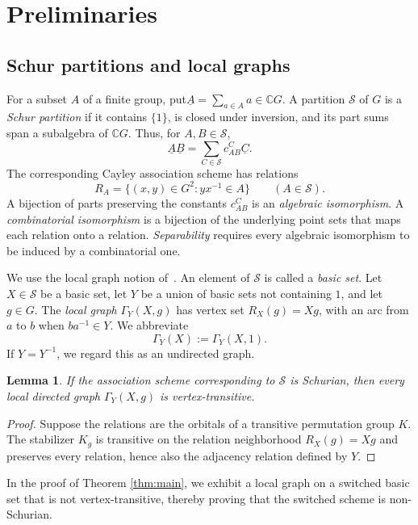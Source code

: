 \documentclass[11pt]{amsart}
\numberwithin{equation}{section}
\newtheorem{lemma}[theorem]{Lemma}
\theoremstyle{definition}
\theoremstyle{remark}
\newcommand{\C}{\mathbb C}
\newcommand{\clsum}[1]{\underline{#1}}
\begin{document}
\section{Preliminaries}

\subsection{Schur partitions and local graphs}

For a subset $A$ of a finite group, put$\clsum{A}=\sum_{a\in A}a\in\C G$.
A partition $\mathcal S$ of $G$ is a \emph{Schur partition} if it contains $\{1\}$, is closed under inversion, and its part sums span a subalgebra of $\C G$. 
Thus, for $A,B\in\mathcal S$,
\[
 \clsum{A}\clsum{B}=\sum_{C\in\mathcal S}c_{AB}^{C}\clsum{C}.
\]
The corresponding Cayley association scheme has relations
\[
 R_A=\{(x,y)\in G^2:yx^{-1}\in A\}\qquad(A\in\mathcal S).
\]
A bijection of parts preserving the constants $c_{AB}^C$ is an
\emph{algebraic isomorphism}. 
A \emph{combinatorial isomorphism} is a bijection of the underlying point sets that maps each relation onto a relation.
\emph{Separability} requires every algebraic isomorphism to be induced by a combinatorial one.

We use the local graph notion of~\cite[Definition~3.7]{HKK}. 
An element of $\mathcal S$ is called a \emph{basic set}. 
Let $X\in\mathcal S$ be a basic set, let $Y$ be a union of basic sets not containing $1$, and let $g\in G$. 
The \emph{local graph} $\Gamma_Y(X,g)$ has vertex set $R_X(g)=Xg$, with an arc from $a$ to $b$ when $ba^{-1}\in Y$. 
We abbreviate
\[
 \Gamma_Y(X):=\Gamma_Y(X,1).
\]
If $Y=Y^{-1}$, we regard this as an undirected graph.

\begin{lemma}\label{lem:local-schurian}
If the association scheme corresponding to $\mathcal S$ is Schurian, then every local directed graph $\Gamma_Y(X,g)$ is vertex-transitive.
\end{lemma}
\begin{proof}
Suppose the relations are the orbitals of a transitive permutation group $K$. 
The stabilizer $K_g$ is transitive on the relation neighborhood $R_X(g)=Xg$ and preserves every relation, hence also the adjacency relation defined by $Y$.
\end{proof}

In the proof of Theorem \ref{thm:main}, we exhibit a local graph on a switched basic set that is not vertex-transitive, thereby proving that the switched scheme is non-Schurian. 
\end{document}
